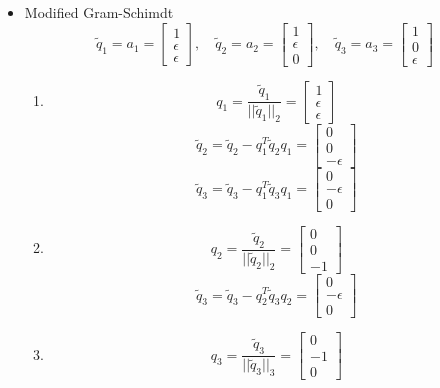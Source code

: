 \documentclass[english,onecolumn]{IEEEtran}
\begin{document}
\begin{enumerate}
\begin{itemize}
   	\item Modified Gram-Schimdt
   	$$\tilde{q}_1 = a_1= \begin{bmatrix}  1 \\ \epsilon \\ \epsilon \end{bmatrix},\quad \tilde{q}_2 = a_2= \begin{bmatrix}  1 \\ \epsilon \\ 0 \end{bmatrix},\quad \tilde{q}_3 = a_3 = \begin{bmatrix}  1 \\ 0\\ \epsilon \end{bmatrix}$$
   	\begin{enumerate}
   	\item 
   	$$q_1 = \frac{\tilde{q}_1}{||\tilde{q}_1||_2}=\begin{bmatrix}  1 \\ \epsilon \\ \epsilon \end{bmatrix}$$
   	$$\tilde{q}_2=\tilde{q}_2 - q_1^T\tilde{q}_2q_1 = \begin{bmatrix}  0 \\ 0 \\ -\epsilon \end{bmatrix}$$
   	$$\tilde{q}_3=\tilde{q}_3-q_1^T\tilde{q}_3q_1=\begin{bmatrix}  0 \\ -\epsilon \\ 0 \end{bmatrix}$$
   	\item 
   	$$q_2 = \frac{\tilde{q}_2}{||\tilde{q}_2||_2}=\begin{bmatrix}  0 \\ 0 \\ -1\end{bmatrix}$$
   	$$\tilde{q}_3 =\tilde{q}_3-q_2^T\tilde{q}_3q_2=\begin{bmatrix}  0 \\ -\epsilon \\ 0 \end{bmatrix}$$
   	\item 
   	$$q_3 = \frac{\tilde{q}_3}{||\tilde{q}_3||_3}=\begin{bmatrix}  0 \\ -1 \\ 0\end{bmatrix}$$
   	\end{enumerate}

\end{itemize}
\end{enumerate}
\end{document}
